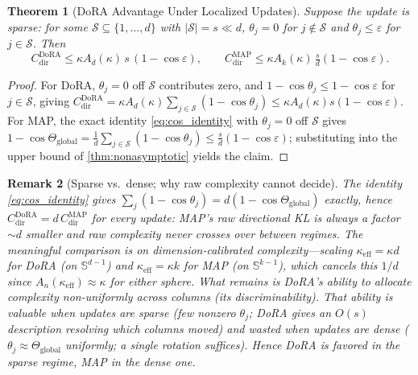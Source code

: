 \documentclass[11pt]{article}
\newtheorem{theorem}{Theorem}[section]
\newtheorem{remark}[theorem]{Remark}
\newcommand{\Ad}{A_d}
\newcommand{\Ak}{A_k}
\newcommand{\Sd}{\mathbb{S}^{d-1}}
\newcommand{\Sk}{\mathbb{S}^{k-1}}
\newcommand{\Thetaglob}{\Theta_{\mathrm{global}}}
\begin{document}
\setcounter{theorem}{11} %
\begin{theorem}[DoRA Advantage Under Localized Updates]\label{thm:dora_advantage}
Suppose the update is sparse: for some $\mathcal{S}\subseteq\{1,\dots,d\}$ with
$|\mathcal{S}|=s\ll d$, $\theta_j=0$ for $j\notin\mathcal{S}$ and
$\theta_j\le\varepsilon$ for $j\in\mathcal{S}$. Then
\[
C^{\mathrm{DoRA}}_{\mathrm{dir}}\le\kappa \Ad(\kappa)\,s\,(1-\cos\varepsilon),
\qquad
C^{\mathrm{MAP}}_{\mathrm{dir}}\le\kappa \Ak(\kappa)\,\tfrac{s}{d}(1-\cos\varepsilon).
\]
\end{theorem}
\begin{proof}
For DoRA, $\theta_j=0$ off $\mathcal{S}$ contributes zero, and $1-\cos\theta_j\le1-\cos\varepsilon$
for $j\in\mathcal{S}$, giving $C^{\mathrm{DoRA}}_{\mathrm{dir}}=\kappa \Ad(\kappa)\sum_{j\in\mathcal{S}}(1-\cos\theta_j)\le\kappa \Ad(\kappa)s(1-\cos\varepsilon)$.
For MAP, the exact identity \eqref{eq:cos_identity} with $\theta_j=0$ off $\mathcal{S}$ gives
$1-\cos\Thetaglob=\frac1d\sum_{j\in\mathcal{S}}(1-\cos\theta_j)\le\frac{s}{d}(1-\cos\varepsilon)$;
substituting into the upper bound of \cref{thm:nonasymptotic} yields the claim.
\end{proof}

\begin{remark}[Sparse vs.\ dense; why raw complexity cannot decide]\label{rem:regimes}
The identity \eqref{eq:cos_identity} gives $\sum_j(1-\cos\theta_j)=d(1-\cos\Thetaglob)$
\emph{exactly}, hence $C^{\mathrm{DoRA}}_{\mathrm{dir}}=d\,C^{\mathrm{MAP}}_{\mathrm{dir}}$ for
\emph{every} update: MAP's raw directional KL is always a factor ${\sim}d$ smaller and
raw complexity \emph{never crosses over} between regimes. The meaningful comparison is
on \emph{dimension-calibrated} complexity---scaling $\kappa_{\mathrm{eff}}=\kappa d$ for
DoRA (on $\Sd$) and $\kappa_{\mathrm{eff}}=\kappa k$ for MAP (on $\Sk$), which cancels
this $1/d$ since $A_n(\kappa_{\mathrm{eff}})\!\approx\!\kappa$ for either sphere. What
remains is DoRA's ability to allocate complexity \emph{non-uniformly} across columns
(its discriminability). That ability is valuable when updates are \emph{sparse} (few
nonzero $\theta_j$; DoRA gives an $O(s)$ description resolving which columns moved) and
wasted when updates are \emph{dense} ($\theta_j\approx\Thetaglob$ uniformly; a single
rotation suffices). Hence DoRA is favored in the sparse regime, MAP in the dense one.
\end{remark}

\end{document}
